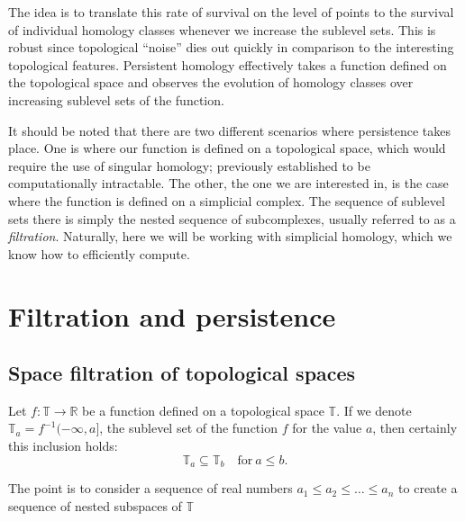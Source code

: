 The idea is to translate this rate of survival on the level of points to the survival of individual homology classes whenever we increase the sublevel sets. This is robust since topological ``noise'' dies out quickly in comparison to the interesting topological features. Persistent homology effectively takes a function defined on the topological space and observes the evolution of homology classes over increasing sublevel sets of the function.

It should be noted that there are two different scenarios where persistence takes place. One is where our function is defined on a topological space, which would require the use of singular homology; previously established to be computationally intractable. The other, the one we are interested in, is the case where the function is defined on a simplicial complex. The sequence of sublevel sets there is simply the nested sequence of subcomplexes, usually referred to as a \textit{filtration}. Naturally, here we will be working with simplicial homology, which we know how to efficiently compute.

\section{Filtration and persistence}
\subsection{Space filtration of topological spaces}

Let $f: \mathbb{T} \to \mathbb{R}$ be a function defined on a topological space $\mathbb{T}$. If we denote $\mathbb{T}_{a} = f^{-1}(-\infty, a]$, the sublevel set of the function $f$ for the value $a$, then certainly this inclusion holds:
  \begin{equation*}
    \mathbb{T}_{a} \subseteq \mathbb{T}_{b} \quad \text{for}\: a \leq b.
  \end{equation*}

  The point is to consider a sequence of real numbers $a_{1} \leq a_{2} \leq \ldots \leq a_{n}$ to create a sequence of nested subspaces of $\mathbb{T}$

  \begin{figure}[h]
    \centering


  \end{figure}


